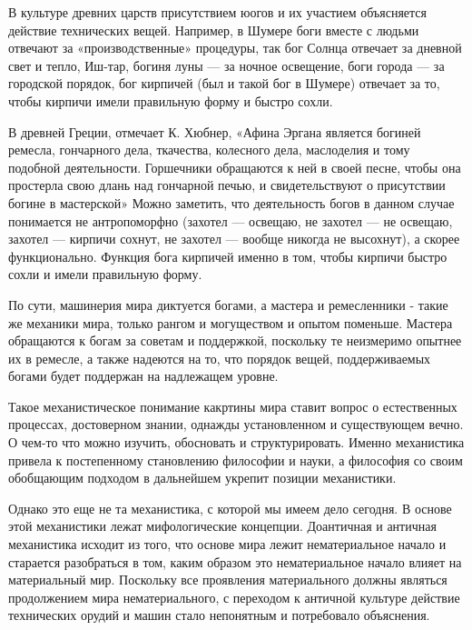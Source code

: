\documentclass[a4paper]{article}
\begin{document}
{В культуре древних царств присутствием юогов и их участием объясняется действие технических вещей. Например, в Шумере боги вместе с людьми отвечают за «производственные» процедуры, так бог Солнца отвечает за дневной свет и тепло, Иш-тар, богиня луны — за ночное освещение, боги города — за городской порядок, бог кирпичей (был и такой бог в Шумере) отвечает за то, чтобы кирпичи имели правильную форму и быстро сохли.

В древней Греции, отмечает К. Хюбнер, «Афина Эргана является богиней ремесла, гончарного дела, ткачества, колесного дела, маслоделия и тому подобной деятельности. Горшечники обращаются к ней в своей песне, чтобы она простерла свою длань над гончарной печью, и свидетельствуют о присутствии богине в мастерской» Можно заметить, что деятельность богов в данном случае понимается не антропоморфно (захотел — освещаю, не захотел — не освещаю, захотел — кирпичи сохнут, не захотел — вообще никогда не высохнут), а скорее функционально. Функция бога кирпичей именно в том, чтобы кирпичи быстро сохли и имели правильную форму.

По сути, машинерия мира диктуется богами, а мастера и ремесленники - такие же механики мира, только рангом и могуществом и опытом поменьше. Мастера обращаются к богам за советам и поддержкой, поскольку те неизмеримо опытнее их в ремесле, а также надеются на то, что порядок вещей, поддерживаемых богами будет поддержан на надлежащем уровне.

Такое механистическое понимание какртины мира ставит вопрос о естественных процессах, достоверном знании, однажды установленном и существующем вечно. О чем-то что можно изучить, обосновать и структурировать. Именно механистика привела к постепенному становлению философии и науки, а философия со своим обобщающим подходом в дальнейшем укрепит позиции механистики. 

Однако это еще не та механистика, с которой мы имеем дело сегодня. В основе этой механистики лежат мифологические концепции. Доантичная и античная механистика исходит из того, что основе мира лежит нематериальное начало и старается разобраться в том, каким образом это нематериальное начало влияет на материальный мир. Поскольку все проявления материального должны являться продолжением мира нематериального, с переходом к античной культуре действие технических орудий и машин стало непонятным и потребовало объяснения. 

}
\end{document}
